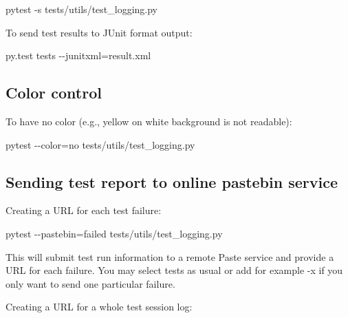\documentclass[
]{report}
\newenvironment{Shaded}{\begin{snugshade}}{\end{snugshade}}
\newcommand{\AttributeTok}[1]{\textcolor[rgb]{0.40,0.45,0.13}{#1}}
\newcommand{\ExtensionTok}[1]{\textcolor[rgb]{0.00,0.23,0.31}{#1}}
\newcommand{\NormalTok}[1]{\textcolor[rgb]{0.00,0.23,0.31}{#1}}
\newcommand{\OperatorTok}[1]{\textcolor[rgb]{0.37,0.37,0.37}{#1}}
\begin{document}
\begin{Shaded}
\begin{Highlighting}[]
\ExtensionTok{pytest} \AttributeTok{{-}s}\NormalTok{ tests/utils/test\_logging.py}
\end{Highlighting}
\end{Shaded}

To send test results to JUnit format output:

\begin{Shaded}
\begin{Highlighting}[]
\ExtensionTok{py.test}\NormalTok{ tests }\AttributeTok{{-}{-}junitxml}\OperatorTok{=}\NormalTok{result.xml}
\end{Highlighting}
\end{Shaded}

\subsection{Color control}\label{color-control}

To have no color (e.g., yellow on white background is not readable):

\begin{Shaded}
\begin{Highlighting}[]
\ExtensionTok{pytest} \AttributeTok{{-}{-}color}\OperatorTok{=}\NormalTok{no tests/utils/test\_logging.py}
\end{Highlighting}
\end{Shaded}

\subsection{Sending test report to online pastebin
service}\label{sending-test-report-to-online-pastebin-service}

Creating a URL for each test failure:

\begin{Shaded}
\begin{Highlighting}[]
\ExtensionTok{pytest} \AttributeTok{{-}{-}pastebin}\OperatorTok{=}\NormalTok{failed tests/utils/test\_logging.py}
\end{Highlighting}
\end{Shaded}

This will submit test run information to a remote Paste service and
provide a URL for each failure. You may select tests as usual or add for
example -x if you only want to send one particular failure.

Creating a URL for a whole test session log:
\end{document}

